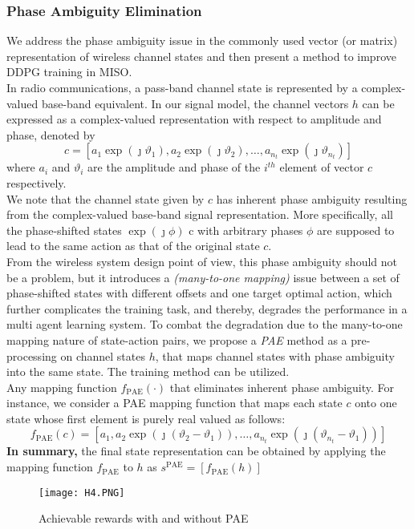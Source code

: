 \subsubsection{Phase Ambiguity Elimination}
We address the phase ambiguity issue in the commonly used vector (or matrix) representation of wireless channel states and then present a method to improve DDPG training in MISO.\\
In radio communications, a pass-band channel state is represented by a complex-valued base-band equivalent. In our signal model, the channel vectors $h$ can be expressed as a complex-valued representation with respect to amplitude and phase, denoted by
\begin{equation}
    c = \left[ a_1 \exp\left( \jmath \vartheta_1 \right), a_2 \exp\left( \jmath \vartheta_2 \right), \ldots, a_{n_t} \exp\left( \jmath \vartheta_{n_t} \right) \right]
\end{equation}
where $a_i$ and $\vartheta_i$ are the amplitude and phase of the $i^{th}$ element of vector $c$ respectively. \\
We note that the channel state given by $c$ has inherent phase ambiguity resulting from the complex-valued base-band signal representation.
More specifically, all the phase-shifted states $\exp\left( \jmath \phi \right)$ c with arbitrary phases $\phi$ are supposed to lead to the same action as that of the original state $c$. \\

From the wireless system design point of view, this phase ambiguity should not be a problem, but it introduces a \emph{(many-to-one mapping)} issue between a set of phase-shifted states with different offsets and one target optimal action, which further complicates the
training task, and thereby, degrades the performance in a multi agent learning system. To combat the degradation due to the many-to-one mapping nature of state-action pairs,
we propose a \emph{PAE} method as a pre-processing on channel states $h$, that maps channel states with phase ambiguity into the same state. The training method can be utilized. \\

Any mapping function $f_{\text{PAE}}(\cdot)$ that eliminates inherent phase ambiguity. For instance, we consider a PAE mapping function that maps each state $c$ onto one state whose first element is purely real valued as follows:
\begin{equation}
    \label{Mapping function}
    f_{\text{PAE}}(c) = \left[ a_1 , a_2 \exp \left( \jmath \left( \vartheta_2 - \vartheta_1 \right) \right) , \ldots , a_{n_t} \exp \left( \jmath \left( \vartheta_{n_t} - \vartheta_1 \right) \right) \right]
\end{equation}
\textbf{In summary,} the final state representation can be obtained by applying the mapping function $f_{\text{PAE}}$ to $h$ as $s^{\text{PAE}} = \left[ f_{\text{PAE}}(h) \right]$ \\
\begin{wrapfigure}{ht}{0.5\textwidth}
    \texttt{[image: H4.PNG]}
    \caption{Achievable rewards with and without PAE}
    \label{fig:Achievable rewards with and without PAE}
\end{wrapfigure}

